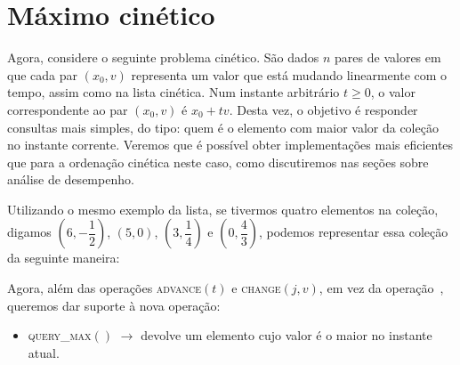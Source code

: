 

\chapter{Máximo cinético}\label{ch:maximo-cinetico}
Agora, considere o seguinte problema cinético.
São dados $n$ pares de valores em que cada par $(x_0, v)$ representa um valor que está mudando
linearmente com o tempo, assim como na lista cinética.
Num instante arbitrário $t \geq 0$, o valor correspondente ao par $(x_0, v)$ é $x_0 + tv$.
Desta vez, o objetivo é responder consultas mais simples, do tipo: quem é o elemento com maior
valor da coleção no instante corrente.
Veremos que é possível obter implementações mais eficientes que para a ordenação cinética neste
caso, como discutiremos nas seções sobre análise de desempenho.

Utilizando o mesmo exemplo da lista, se tivermos quatro elementos na coleção,
digamos $\left(6, -\dfrac{1}{2}\right)$, $(5, 0)$, $\left(3,
\dfrac{1}{4}\right)$ e $\left(0, \dfrac{4}{3}\right)$, podemos representar essa
coleção da seguinte maneira:



Agora, além das operações \textsc{advance}$(t)$ e \textsc{change}$(j, v)$, em
vez da operação~, queremos dar suporte à nova operação:
\begin{itemize}
    \item \textsc{query\_max}$()$ $\rightarrow$ devolve um elemento cujo valor é
    o maior no instante atual.
\end{itemize}


